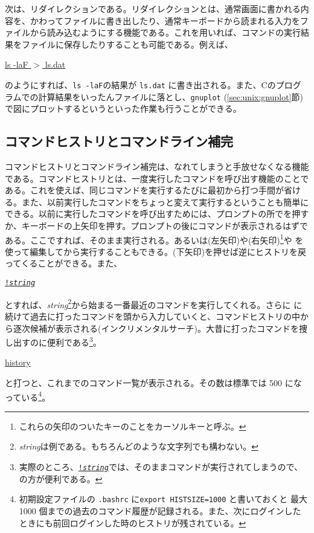 次は、リダイレクションである。リダイレクションとは、通常画面に書かれる内容を、かわってファイルに書き出したり、通常キーボードから読まれる入力をファイルから読み込むようにする機能である。これを用いれば、コマンドの実行結果をファイルに保存したりすることも可能である。例えば、
\begin{commandline2}
\prompt \underline{ls -laF $>$ ls.dat}
\end{commandline2} \noindent
のようにすれば、{\tt ls -laF}の結果が {\tt ls.dat} に書き出される。また、Cのプログラムでの計算結果をいったんファイルに落とし、{\tt gnuplot} (\ref{sec:unix:gnuplot}節)で図にプロットするというといった作業も行うことができる。

\subsection{コマンドヒストリとコマンドライン補完}

コマンドヒストリとコマンドライン補完は、なれてしまうと手放せなくなる機能である。コマンドヒストリとは、一度実行したコマンドを呼び出す機能のことである。これを使えば、同じコマンドを実行するたびに最初から打つ手間が省ける。また、以前実行したコマンドをちょっと変えて実行するということも簡単にできる。以前に実行したコマンドを呼び出すためには、プロンプトの所でを押すか、キーボードの上矢印を押す。プロンプトの後にコマンドが表示されるはずである。ここで\ret すれば、そのまま実行される。あるいは(左矢印)や(右矢印)\footnote{これらの矢印のついたキーのことをカーソルキーと呼ぶ。}や \BS を使って編集してから実行することもできる。(下矢印)を押せば逆にヒストリを戻ってくることができる。また、
\begin{commandline2}
\prompt \underline{{\tt !{\it string}}}
\end{commandline2} \noindent
とすれば、{\it string}\footnote{{\it string}は例である。もちろんどのような文字列でも構わない。}から始まる一番最近のコマンドを実行してくれる。さらに に続けて過去に打ったコマンドを頭から入力していくと、コマンドヒストリの中から逐次候補が表示される(インクリメンタルサーチ)。大昔に打ったコマンドを捜し出すのに便利である\footnote{実際のところ、\underline{\tt !{\it string}}では、そのままコマンドが実行されてしまうので、の方が便利である。}。
\begin{commandline2}
\prompt \underline{history}
\end{commandline2} \noindent
と打つと、これまでのコマンド一覧が表示される。その数は標準では 500 になっている\footnote{初期設定ファイルの {\tt .bashrc} に{\tt export HISTSIZE=1000} と書いておくと  最大 1000 個までの過去のコマンド履歴が記録される。また、次にログインしたときにも前回ログインした時のヒストリが残されている。}。

